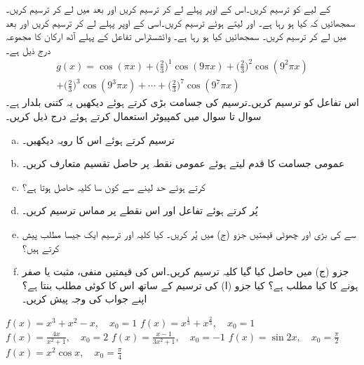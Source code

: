  کے لیے  کو ترسیم کریں۔اس کے اوپر پہلے  لے کر   ترسیم کریں اور بعد میں  لے کر ترسیم کریں۔سمجھائیں کہ کیا ہو رہا ہے۔
 اور  لیتے ہوئے  ترسیم کریں۔اسی کے اوپر پہلے  لے کر   ترسیم کریں اور بعد میں  لے کر ترسیم کریں۔ سمجھائیں کیا ہو رہا ہے۔ 
وائشسٹراس تفاعل  کے پہلے آٹھ ارکان کا مجموعہ درج ذیل ہے۔
\begin{multline*}
g(x)=\cos (\pi x)+\big(\frac{2}{3}\big)^1\cos (9\pi x)+\big(\frac{2}{3}\big)^2\cos (9^2\pi x)\\
+\big(\frac{2}{3}\big)^3\cos (9^3\pi x)+\cdots+\big(\frac{2}{3}\big)^7\cos (9^7\pi x)
\end{multline*}
اس تفاعل کو ترسیم کریں۔ترسیم کی جسامت بڑی کرتے ہوئے دیکھیں  یہ کتنی بلدار ہے۔
سوال  تا سوال  میں کمپیوٹر استعمال کرتے ہوئے درج ذیل کریں۔
\begin{enumerate}[a.]

\item
{} ترسیم کرتے ہوئے اس کا رویہ دیکھیں۔
\item
عمومی جسامت  کا قدم  لیتے ہوئے عمومی نقطہ   پر حاصل تقسیم   متعارف کریں۔
\item
{} کرتے ہوئے حد لینے سے کون سا کلیہ حاصل ہوتا ہے؟
\item
{} پُر کرتے ہوئے تفاعل اور اس نقطے پر مماس ترسیم کریں۔
\item
{} سے  کی بڑی اور چھوٹی قیمتیں جزو (ج) میں پُر کریں۔ کیا کلیہ اور ترسیم ایک جیسا مطلب پیش کرتے ہیں؟
\item
جزو (ج) میں حاصل کیا گیا کلیہ ترسیم کریں۔اس کی قیمتیں منفی، مثبت یا صفر ہونے کا کیا مطلب ہے؟ کیا جزو (ا) کی ترسیم کے ساتھ اس کا کوئی مطلب بنتا ہے؟ اپنے جواب کی وجہ پیش کریں۔
\end{enumerate}

$f(x)=x^3+x^2-x,\quad x_0=1$
$f(x)=x^{\tfrac{1}{3}}+x^{\tfrac{2}{3}},\quad x_0=1$
$f(x)=\tfrac{4x}{x^2+1},\quad x_0=2$
$f(x)=\tfrac{x-1}{3x^2+1},\quad x_0=-1$
$f(x)=\sin 2x,\quad x_0=\tfrac{\pi}{2}$
$f(x)=x^2\cos x,\quad x_0=\tfrac{\pi}{4}$

